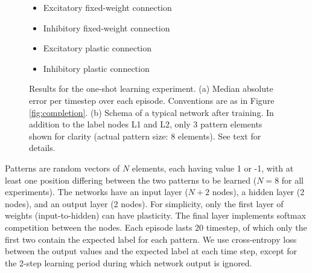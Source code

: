\documentclass{article}
\begin{document}
\begin{figure}[b]
\begin{subfigure}[t]{0.4\textwidth}
\end{subfigure}
\begin{minipage}[b]{0.2\textwidth}
\noindent
\small
\begin{itemize}[leftmargin=*] %
\item[]\tikz{\path[very thick,->,draw=black] %
        (0,0) -- (1,0) ;}Excitatory fixed-weight connection
\item[]\tikz{\path[very thick,->,draw=blue,opacity=0.33] %
        (0,0) -- (1,0) ;}Inhibitory fixed-weight connection
\item[]\tikz{\path[very thick,->,dashed,draw=black] %
        (0,0) -- (1,0) ;}Excitatory plastic connection
\item[]\tikz{\path[very thick,->,dashed,draw=blue,opacity=0.33] %
        (0,0) -- (1,0) ;}Inhibitory plastic connection
\end{itemize}
\end{minipage}

\caption{Results for the one-shot learning experiment. (a) Median absolute error
    per timestep over each episode. Conventions are as in Figure
    \ref{fig:completion}.
(b) Schema of a
typical network after training. In addition to the label nodes L1 and L2, only 3 pattern elements shown for clarity (actual
pattern size: 8 elements). See text for details.}
\label{fig:oneshot}
\end{figure}

Patterns are random vectors of $N$ elements, each having
value 1 or -1, with at least one position differing between the two patterns to
be learned ($N=8$ for all experiments). The networks have an input layer ($N+2$ nodes), a hidden layer (2 nodes), and an
output layer (2 nodes). For simplicity, only the first layer of weights
(input-to-hidden) can have plasticity. The final layer implements softmax
competition between the nodes. Each episode lasts 20 timestep, of which only the first
two contain the expected label for each pattern. We use cross-entropy loss
between the output values and the expected label at each time step, except for
the 2-step learning period during which network output is ignored.
\end{document}

